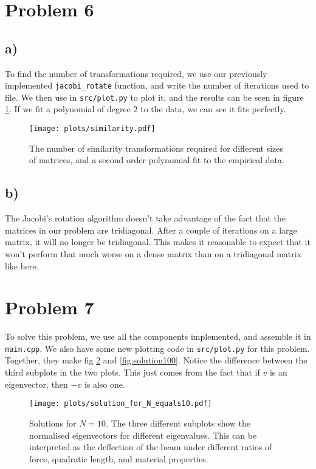 \documentclass[english,notitlepage]{revtex4-1}  %
\begin{document}
\section*{Problem 6}
\subsection*{a)}
To find the number of transformations required, we use our previously implemented \lstinline{jacobi_rotate} function, and write the number of iterations used to file. We then use in \lstinline{src/plot.py} to plot it, and the results can be seen in figure \ref{fig:similarity}. If we fit a polynomial of degree $2$ to the data, we can see it fits perfectly.

\begin{figure}
    \centering
    \texttt{[image: plots/similarity.pdf]}
    \caption{The number of similarity transformations required for different sizes of matrices, and a second order polynomial fit to the empirical data.}
    \label{fig:similarity}
\end{figure}

\subsection*{b)}
The Jacobi's rotation algorithm doesn't take advantage of the fact that the matrices in our problem are tridiagonal. After a couple of iterations on a large matrix, it will no longer be tridiagonal. This makes it reasonable to expect that it won't perform that much worse on a dense matrix than on a tridiagonal matrix like here.

\section*{Problem 7}
To solve this problem, we use all the components implemented, and assemble it in \lstinline{main.cpp}. We also have some new plotting code in \lstinline{src/plot.py} for this problem. Together, they make fig \ref{fig:solution10} and \ref{fig:solution100}. Notice the difference between the third subplots in the two plots. This just comes from the fact that if $v$ is an eigenvector, then $-v$ is also one.

\begin{figure}
    \centering
    \texttt{[image: plots/solution\_for\_N\_equals10.pdf]}
    \caption{Solutions for $N = 10$. The three different subplots show the normalised eigenvectors for different eigenvalues. This can be interpreted as the deflection of the beam under different ratios of force, quadratic length, and material properties.}
    \label{fig:solution10}
\end{figure}
\end{document}
